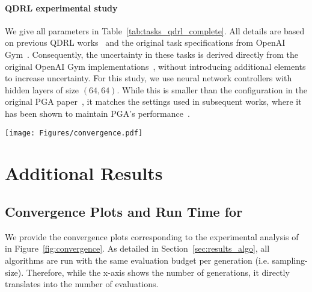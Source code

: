 \paragraph{QDRL experimental study}
We give all parameters in Table~\ref{tab:tasks_qdrl_complete}. 
All details are based on previous QDRL works~\cite{nilsson2021policy, tjanaka2022approximating, faldor2023synergizing, mace2023quality} and the original task specifications from OpenAI Gym~\cite{towers2024gymnasium}. Consequently, the uncertainty in these tasks is derived directly from the original OpenAI Gym implementations~\cite{towers2024gymnasium}, without introducing additional elements to increase uncertainty.
For this study, we use neural network controllers with hidden layers of size $(64, 64)$. While this is smaller than the configuration in the original PGA paper~\cite{nilsson2021policy}, it matches the settings used in subsequent works, where it has been shown to maintain PGA’s performance~\cite{tjanaka2022approximating, faldor2023synergizing}.





\begin{figure*}[t!]
  \centering
  \texttt{[image: Figures/convergence.pdf]}
  \caption{
    Results of our \name{} approach compared to existing UQD approaches tackling the Performance Estimation problem. The plain line indicates the median over $10$ replications, the shaded area corresponds to the quartiles. 
  }
  \label{fig:convergence}
\end{figure*}

\newpage


\section{Additional Results} \label{app:results}

\subsection{Convergence Plots and Run Time for \name{}}

We provide the convergence plots corresponding to the experimental analysis of \name{} in Figure~\ref{fig:convergence}. As detailed in Section~\ref{sec:results_algo}, all algorithms are run with the same evaluation budget per generation (i.e. sampling-size). Therefore, while the x-axis shows the number of generations, it directly translates into the number of evaluations.

